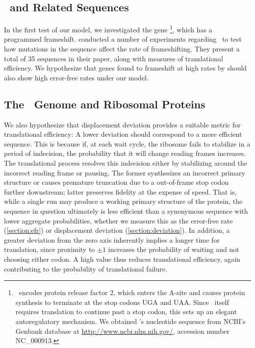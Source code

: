\documentclass[12pt]{article}
\begin{document}
\subsection{\prfB\ and Related Sequences}
In the first test of our model, we investigated the gene
\prfB\footnote{
  \prfB\ encodes protein release factor 2, which enters
  the A-site and causes protein synthesis to terminate at the stop
  codons \textsc{UGA} and \textsc{UAA}. Since \prfB\ itself requires 
  translation to continue past a stop codon, this sets up an elegant 
  autoregulatory mechanism. We obtained \prfB's nucleotide sequence from
  NCBI's Genbank database at \url{http://www.ncbi.nlm.nih.gov/}, accession
  number NC\_000913.
}, which has a programmed frameshift.
\citet{weiss87} conducted a number of experiments regarding
\prfB\ to test how mutations in the sequence affect the rate of
frameshifting.  They present a total of 35 sequences in their paper,
along with measures of translational efficiency.  We hypothesize that
genes found to frameshift at high rates by
\citeauthor{weiss87} should also show high error-free rates under
our model.

\subsection{The \ecoli\ Genome and Ribosomal Proteins}
We also hypothesize that displacement deviation
provides a suitable metric for translational efficiency: A lower
deviation should correspond to a more efficient sequence.
This is because if, at each wait cycle, the
ribosome fails to stabilize in a period of indecision, the probability
that it will change reading frames increases. The translational
process resolves this indecision either by stabilizing around the
incorrect reading frame or pausing. The former synthesizes an
incorrect primary structure or causes premature truncation due to a
out-of-frame stop codon further downstream; latter preserves fidelity at the
expense of speed. That is, while a single run may produce
a working primary structure of the protein, the sequence in question
ultimately is less efficient than a synonymous sequence with lower
aggregate probabilities, whether we measure this as the
error-free rate (\autoref{section:efr}) or displacement deviation
(\autoref{section:deviation}). In addition, a greater deviation from
the zero axis inherently implies a longer time for translation, 
since proximity to $\pm1$ increases the probability of waiting and not choosing
either codon. A high value thus reduces translational
efficiency, again contributing to the probability of
translational failure.
\end{document}
